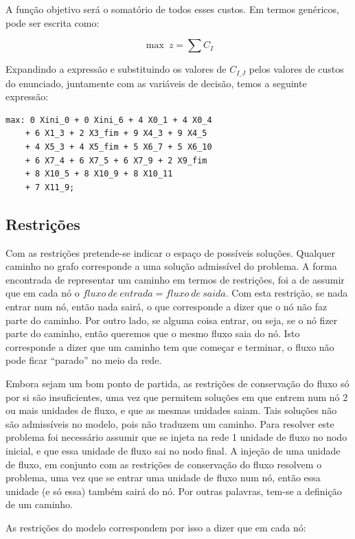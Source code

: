 A função objetivo será o somatório de todos esses custos. Em termos genéricos, pode ser
escrita como:

\begin{displaymath}
\max~z = \sum C_{I}
\end{displaymath}

Expandindo a expressão e substituindo os valores de $C_{I\_J}$ pelos valores de custos do enunciado,
juntamente com as variáveis de decisão, temos a seguinte expressão:

\begin{Verbatim}
max: 0 Xini_0 + 0 Xini_6 + 4 X0_1 + 4 X0_4
	+ 6 X1_3 + 2 X3_fim + 9 X4_3 + 9 X4_5
	+ 4 X5_3 + 4 X5_fim + 5 X6_7 + 5 X6_10
	+ 6 X7_4 + 6 X7_5 + 6 X7_9 + 2 X9_fim
	+ 8 X10_5 + 8 X10_9 + 8 X10_11
	+ 7 X11_9;
\end{Verbatim}

\subsection{Restrições}
\label{p1:sec:restricoes}

Com as restrições pretende-se indicar o espaço de possíveis soluções. Qualquer
caminho no grafo corresponde a uma solução admissível do problema. A forma
encontrada de representar um caminho em termos de restrições, foi a de assumir
que em cada nó o $fluxo~de~entrada = fluxo~de~saida$. Com esta restrição, se
nada entrar num nó, então nada sairá, o que corresponde a dizer que o nó não faz
parte do caminho. Por outro lado, se alguma coisa entrar, ou seja, se o nó fizer
parte do caminho, então queremos que o mesmo fluxo saia do nó. Isto corresponde
a dizer que um caminho tem que começar e terminar, o fluxo não pode ficar
``parado'' no meio da rede. 

Embora sejam um bom ponto de partida, as restrições de conservação do fluxo só
por si são insuficientes, uma vez que permitem soluções em que entrem num nó
2 ou mais unidades de fluxo, e que as mesmas unidades saiam. Tais soluções não
são admissíveis no modelo, pois não traduzem um caminho. Para resolver este
problema foi necessário assumir que se injeta na rede 1 unidade de fluxo no nodo
inicial, e que essa unidade de fluxo sai no nodo final. A injeção de uma unidade
de fluxo, em conjunto com as restrições de conservação do fluxo resolvem
o problema, uma vez que se entrar uma unidade de fluxo num nó, então essa
unidade (e só essa) também sairá do nó. Por outras palavras, tem-se a definição
de um caminho.

As restrições do modelo correspondem por isso a dizer que em cada nó:


